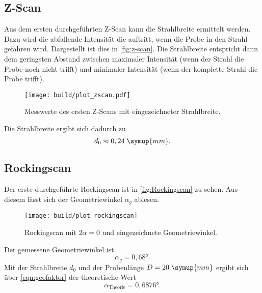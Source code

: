 \subsection{Z-Scan}
Aus dem ersten durchgeführten Z-Scan kann die Strahlbreite ermittelt werden. Dazu wird die 
abfallende Intensität die auftritt, wenn die Probe in den Strahl gefahren wird. Dargestellt ist dies 
in \autoref{fig:z-scan}. Die Strahlbreite entspricht dann dem geringsten Abstand zwischen
maximaler Intensität (wenn der Strahl die Probe noch nicht trifft) und minimaler Intensität
(wenn der komplette Strahl die Probe trifft).
\begin{figure}
    \centering
    \texttt{[image: build/plot\_zscan.pdf]}
    \caption{Messwerte des ersten Z-Scans mit eingezeichneter Strahlbreite.}
    \label{fig:z-scan}
\end{figure}
Die Strahlbreite ergibt sich dadurch zu 
\begin{equation*}
    d_0 \approx 0,24\; \symup{mm}.
\end{equation*} 

\subsection{Rockingscan}
Der erste durchgeführte Rockingscan ist in \autoref{fig:Rockingscan} zu sehen. Aus diesem lässt
sich der Geometriewinkel $\alpha_g$ ablesen. 
\begin{figure}
    \centering 
    \texttt{[image: build/plot\_rockingscan]}
    \caption{Rockingscan mit $2 \alpha = 0$ und eingezeichnete Geometriewinkel.}
    \label{fig:Rockingscan}
\end{figure}
Der gemessene Geometriewinkel ist 
\begin{equation*}
    \alpha_g = 0,68°.
\end{equation*}
Mit der Strahlbreite $d_0$ und der Probenlänge $D = 20\;\symup{mm}$ ergibt sich über 
\autoref{eqn:geofaktor} der theoretische Wert
\begin{equation*}
    \alpha_{\text{Theorie}} = 0,6876°.
\end{equation*}

